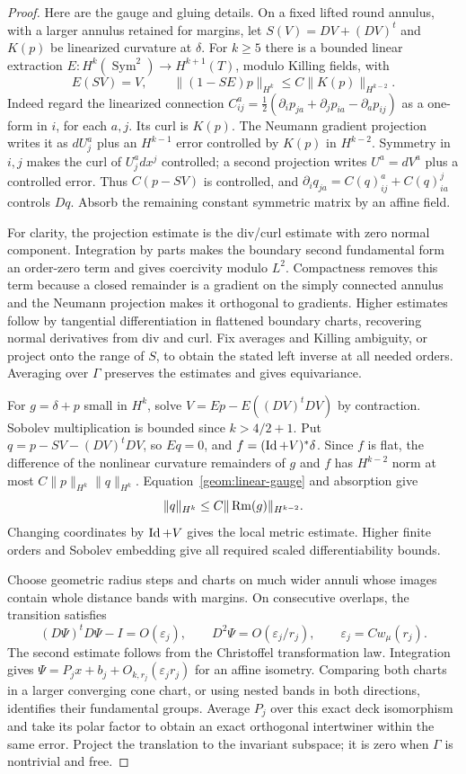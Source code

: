 \begin{proof}
Here are the gauge and gluing details. On a fixed lifted round annulus,
with a larger annulus retained for margins, let
$S(V)=DV+(DV)^t$ and $K(p)$ be linearized curvature at $\delta$.
For $k\geq5$ there is a bounded linear extraction
$E:H^k(\operatorname{Sym}^2)\to H^{k+1}(T)$, modulo Killing fields,
with
\begin{equation}\label{geom:linear-gauge}
 E(SV)=V,\qquad
 \|(1-SE)p\|_{H^k}\leq C\|K(p)\|_{H^{k-2}}.
\end{equation}
Indeed regard the linearized connection
$C^a_{ij}=\tfrac12(\partial_i p_{ja}+\partial_jp_{ia}-\partial_ap_{ij})$
as a one-form in $i$, for each $a,j$. Its curl is $K(p)$.
The Neumann gradient projection writes it as $dU^a_j$ plus an
$H^{k-1}$ error controlled by $K(p)$ in $H^{k-2}$.
Symmetry in $i,j$ makes the curl of $U^a_jdx^j$ controlled; a second
projection writes $U^a=dV^a$ plus a controlled error.
Thus $C(p-SV)$ is controlled, and
$\partial_iq_{ja}=C(q)^a_{ij}+C(q)^j_{ia}$ controls $Dq$.
Absorb the remaining constant symmetric matrix by an affine field.

For clarity, the projection estimate is the div/curl estimate with
zero normal component. Integration by parts makes the boundary
second fundamental form an order-zero term and gives coercivity
modulo $L^2$. Compactness removes this term because a closed remainder
is a gradient on the simply connected annulus and the Neumann
projection makes it orthogonal to gradients. Higher estimates follow
by tangential differentiation in flattened boundary charts, recovering
normal derivatives from div and curl. Fix averages and Killing
ambiguity, or project onto the range of $S$, to obtain the stated
left inverse at all needed orders. Averaging over $\Gamma$ preserves
the estimates and gives equivariance.

For $g=\delta+p$ small in $H^k$, solve
$V=Ep-E((DV)^tDV)$ by contraction. Sobolev multiplication is bounded
since $k>4/2+1$. Put $q=p-SV-(DV)^tDV$, so $Eq=0$, and
$f=(\operatorname{Id}+V)^*\delta$. Since $f$ is flat, the difference of the nonlinear
curvature remainders of $g$ and $f$ has $H^{k-2}$ norm at most
$C\|p\|_{H^k}\|q\|_{H^k}$. Equation~\eqref{geom:linear-gauge} and
absorption give
\[
 \|q\|_{H^k}\leq C\|\operatorname{Rm}(g)\|_{H^{k-2}}.
\]
Changing coordinates by $\operatorname{Id}+V$ gives the local metric estimate.
Higher finite orders and Sobolev embedding give all required scaled
differentiability bounds.

Choose geometric radius steps and charts on much wider annuli whose
images contain whole distance bands with margins. On consecutive
overlaps, the transition satisfies
\[
 (D\Psi)^tD\Psi-I=O(\varepsilon_j),\qquad
 D^2\Psi=O(\varepsilon_j/r_j),\qquad
 \varepsilon_j=Cw_\mu(r_j).
\]
The second estimate follows from the Christoffel transformation law.
Integration gives
$\Psi=P_jx+b_j+O_{k,r_j}(\varepsilon_jr_j)$ for an affine isometry.
Comparing both charts in a larger converging cone chart, or using
nested bands in both directions, identifies their fundamental groups.
Average $P_j$ over this exact deck isomorphism and take its polar
factor to obtain an exact orthogonal intertwiner within the same
error. Project the translation to the invariant subspace; it is zero
when $\Gamma$ is nontrivial and free.


\end{proof}
